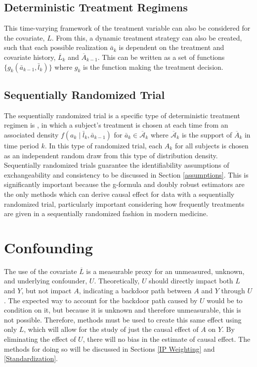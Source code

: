 \subsection{Deterministic Treatment Regimens} 
This time-varying framework of the treatment variable can also be considered for the covariate, $L$.  From this, a dynamic treatment strategy can also be created, such that each possible realization $\bar{a}_{k}$ is dependent on the treatment and covariate history, $\overline{L}_k$ and $\overline{A}_{k-1}$.  This can be written as a set of functions $\{g_k (\bar{a}_{k-1}, \bar{l}_k )\}$ where $g_k$ is the function making the treatment decision.  

\subsection{Sequentially Randomized Trial} 
The sequentially randomized trial is a specific type of deterministic treatment regimen is , in which a subject's treatment is chosen at each time from an associated density $f (a_k \mid \bar{l}_k, \bar{a}_{k-1})$ for $\bar{a}_k \in \overline{\mathcal{A}}_k$ where $\overline{\mathcal{A}}_k$ is the support of $\overline{A}_k$ in time period $k$.\cite{young2011comparative}  In this type of randomized trial, each $A_k$ for all subjects is chosen as an independent random draw from this type of distribution density.  Sequentially randomized trials guarantee the identifiability assumptions of exchangeability and consistency to be discussed in Section \ref{assumptions}.  This is significantly important because the g-formula and doubly robust estimators are the only methods which can derive causal effect for data with a sequentially randomized trial, particularly important considering how frequently treatments are given in a sequentially randomized fashion in modern medicine.

\section{Confounding} 

The use of the covariate $\overline{L}$ is a measurable proxy for an unmeasured, unknown, and underlying confounder, $U$.  Theoretically, $U$ should directly impact both $L$ and $Y$, but not impact $A$, indicating a backdoor path between $A$ and $Y$ through $U$.  \cite{wright2015international}  The expected way to account for the backdoor path caused by $U$ would be to condition on it, but because it is unknown and therefore unmeasurable, this is not possible.  Therefore, methods must be used to create this same effect using only $L$, which will allow for the study of just the causal effect of $A$ on $Y$.  By eliminating the effect of $U$, there will no bias in the estimate of causal effect.  The methods for doing so will be discussed in Sections \ref{IP Weighting} and \ref{Standardization}.  


